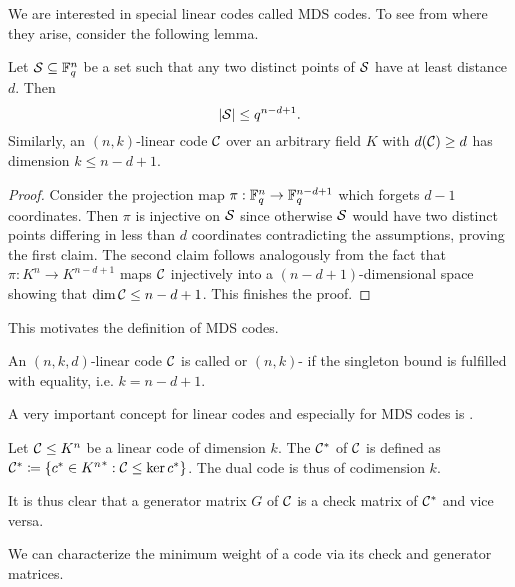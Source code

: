 We are interested in special linear codes called MDS codes. To see from where they arise, consider the following lemma.

\begin{lemma}
    Let $\mathcal{S}\subseteq \mathbb{F}_{q}^n$ be a set such that any two distinct points of $\mathcal{S}$ have at least  distance $d$. Then
    $$
    \left\vert{\mathcal{S}}\right\vert\leq q^{n-d+1}.
    $$
    Similarly, an $(n,k)$-linear code $\mathcal{C}$ over an arbitrary field $K$ with $d(\mathcal{C})\geq d$ has dimension $k\leq n-d+1$.
\end{lemma}

\begin{proof}
    Consider the projection map $\pi:\mathbb{F}_{q}^n\rightarrow\mathbb{F}_{q}^{n-d+1}$ which forgets $d-1$ coordinates.
    Then $\pi$ is injective on $\mathcal{S}$ since otherwise $\mathcal{S}$ would have two distinct points differing in less than $d$ coordinates contradicting the assumptions, proving the first claim.
    The second claim follows analogously from the fact that $\pi:K^n\to K^{n-d+1}$ maps $\mathcal{C}$ injectively into a $(n-d+1)$-dimensional space showing that $\dim{\mathcal{C}}\leq n-d+1$.
    This finishes the proof.
\end{proof}

This motivates the definition of MDS codes.

\begin{definition}
    An $(n,k,d)$-linear code $\mathcal{C}$ is called  or $(n,k)$- if the singleton bound is fulfilled with equality, i.e. $k=n-d+1$. 
\end{definition}

A very important concept for linear codes and especially for MDS codes is .

\begin{definition}\label{lincode-dual}
    Let $\mathcal{C}\leq K^n$ be a linear code of dimension $k$. The  ${\mathcal{C}}^{\ast}$ of $\mathcal{C}$ is defined as $\dual\cC\defeq\set{\dual c\in \dual{K^n}}[\cC\leq \ker \dual c]$. The dual code is thus of codimension $k$.
\end{definition}

\begin{remark}
    It is thus clear that a generator matrix $G$ of $\mathcal{C}$ is a check matrix of ${\mathcal{C}}^{\ast}$ and vice versa.
\end{remark}

We can characterize the minimum weight of a code via its check and generator matrices.

